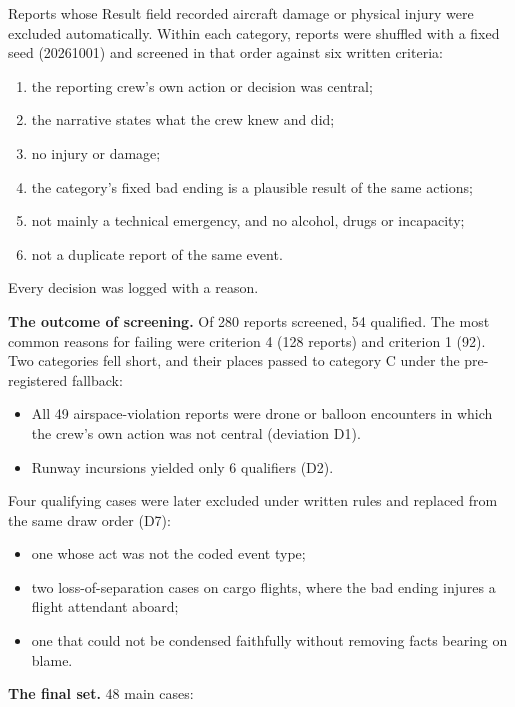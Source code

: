 \documentclass[review,12pt]{elsarticle}
\providecommand{\tightlist}{\setlength{\itemsep}{0pt}\setlength{\parskip}{0pt}}
\begin{document}
Reports whose Result field recorded aircraft damage or physical injury were excluded automatically. Within each category, reports were shuffled with a fixed seed (20261001) and screened in that order against six written criteria:

\begin{enumerate}
\def\labelenumi{\arabic{enumi}.}
\tightlist
\item
  the reporting crew's own action or decision was central;
\item
  the narrative states what the crew knew and did;
\item
  no injury or damage;
\item
  the category's fixed bad ending is a plausible result of the same actions;
\item
  not mainly a technical emergency, and no alcohol, drugs or incapacity;
\item
  not a duplicate report of the same event.
\end{enumerate}

Every decision was logged with a reason.

\textbf{The outcome of screening.} Of 280 reports screened, 54 qualified. The most common reasons for failing were criterion 4 (128 reports) and criterion 1 (92). Two categories fell short, and their places passed to category C under the pre-registered fallback:

\begin{itemize}
\tightlist
\item
  All 49 airspace-violation reports were drone or balloon encounters in which the crew's own action was not central (deviation D1).
\item
  Runway incursions yielded only 6 qualifiers (D2).
\end{itemize}

Four qualifying cases were later excluded under written rules and replaced from the same draw order (D7):

\begin{itemize}
\tightlist
\item
  one whose act was not the coded event type;
\item
  two loss-of-separation cases on cargo flights, where the bad ending injures a flight attendant aboard;
\item
  one that could not be condensed faithfully without removing facts bearing on blame.
\end{itemize}

\textbf{The final set.} 48 main cases:
\end{document}
